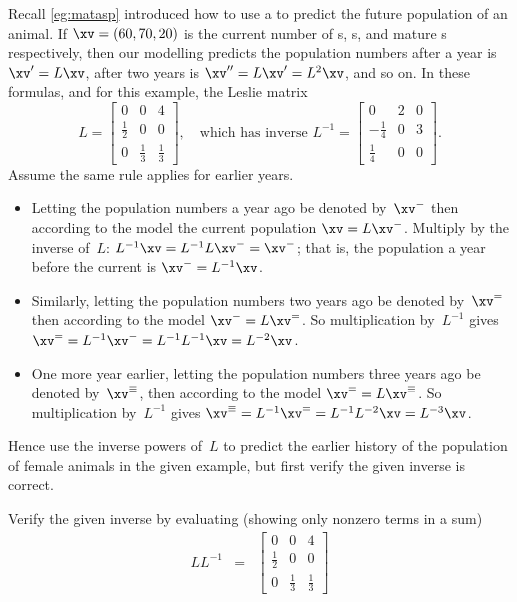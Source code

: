 \begin{example} \label{eg:invph}
Recall \cref{eg:matasp} introduced how to use a  to predict the future population of an animal.
If \(\xv=(60,70,20)\) is the current number of s, s, and mature s respectively, then our modelling predicts the population numbers after a year is \(\xv'=L\xv\), after two years is \(\xv''=L\xv'=L^2\xv\), and so on.
In these formulas, and for this example, the Leslie matrix
\begin{equation*}
L=\begin{bmatrix} 0&0&4\\\frac12&0&0\\0&\frac13&\frac13 \end{bmatrix},
\quad\text{which has inverse }L^{-1}=\begin{bmatrix} 0&2&0\\-\frac14&0&3\\\frac14&0&0 \end{bmatrix}.
\end{equation*} 
Assume the same rule applies for earlier years.
\begin{itemize}
\item Letting the population numbers a year ago be denoted by~\(\xv^-\) then according to the model the current population \(\xv=L\xv^-\).
Multiply by the inverse of~\(L\): \(L^{-1}\xv=L^{-1}L\xv^-=\xv^-\); that is, the population a year before the current is \(\xv^-=L^{-1}\xv\).
\item Similarly, letting the population numbers two years ago be denoted by~\(\xv^=\) then according to the model \(\xv^-=L\xv^=\).
So multiplication by~\(L^{-1}\) gives \(\xv^==L^{-1}\xv^-=L^{-1}L^{-1}\xv=L^{-2}\xv\).
\item One more year earlier, letting the population numbers three years ago be denoted by~\(\xv^\equiv\), then according to the model \(\xv^==L\xv^\equiv\).
So multiplication by~\(L^{-1}\) gives \(\xv^\equiv=L^{-1}\xv^==L^{-1}L^{-2}\xv=L^{-3}\xv\).
\end{itemize}
Hence use the inverse powers of~\(L\) to predict the earlier history of the population of female animals in the given example, but first verify the given inverse is correct.
\begin{solution} 
Verify the given inverse by evaluating (showing only nonzero terms in a sum)
\begin{eqnarray*}
LL^{-1}&=&
\begin{bmatrix} 0&0&4\\\frac12&0&0\\0&\frac13&\frac13 \end{bmatrix}

\end{eqnarray*}
\end{solution}
\end{example}
